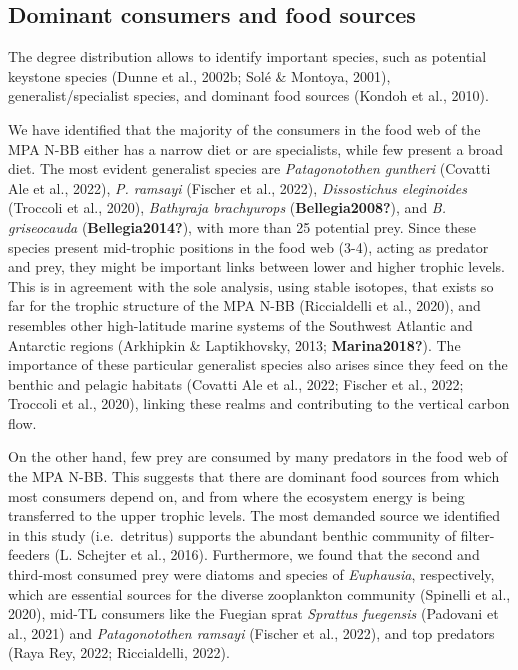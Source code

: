 \documentclass[preprint, 3p,
authoryear]{elsarticle} %
\begin{document}
\hypertarget{dominant-consumers-and-food-sources}{%
\subsection{Dominant consumers and food
sources}\label{dominant-consumers-and-food-sources}}

The degree distribution allows to identify important species, such as
potential keystone species (Dunne et al., 2002b; Solé \& Montoya, 2001),
generalist/specialist species, and dominant food sources (Kondoh et al.,
2010).

We have identified that the majority of the consumers in the food web of
the MPA N-BB either has a narrow diet or are specialists, while few
present a broad diet. The most evident generalist species are
\emph{Patagonotothen guntheri} (Covatti Ale et al., 2022), \emph{P.
ramsayi} (Fischer et al., 2022), \emph{Dissostichus eleginoides}
(Troccoli et al., 2020), \emph{Bathyraja brachyurops}
(\textbf{Bellegia2008?}), and \emph{B. griseocauda}
(\textbf{Bellegia2014?}), with more than 25 potential prey. Since these
species present mid-trophic positions in the food web (3-4), acting as
predator and prey, they might be important links between lower and
higher trophic levels. This is in agreement with the sole analysis,
using stable isotopes, that exists so far for the trophic structure of
the MPA N-BB (Riccialdelli et al., 2020), and resembles other
high-latitude marine systems of the Southwest Atlantic and Antarctic
regions (Arkhipkin \& Laptikhovsky, 2013; \textbf{Marina2018?}). The
importance of these particular generalist species also arises since they
feed on the benthic and pelagic habitats (Covatti Ale et al., 2022;
Fischer et al., 2022; Troccoli et al., 2020), linking these realms and
contributing to the vertical carbon flow.

On the other hand, few prey are consumed by many predators in the food
web of the MPA N-BB. This suggests that there are dominant food sources
from which most consumers depend on, and from where the ecosystem energy
is being transferred to the upper trophic levels. The most demanded
source we identified in this study (i.e.~detritus) supports the abundant
benthic community of filter-feeders (L. Schejter et al., 2016).
Furthermore, we found that the second and third-most consumed prey were
diatoms and species of \emph{Euphausia}, respectively, which are
essential sources for the diverse zooplankton community (Spinelli et
al., 2020), mid-TL consumers like the Fuegian sprat \emph{Sprattus
fuegensis} (Padovani et al., 2021) and \emph{Patagonotothen ramsayi}
(Fischer et al., 2022), and top predators (Raya Rey, 2022; Riccialdelli,
2022).
\end{document}
